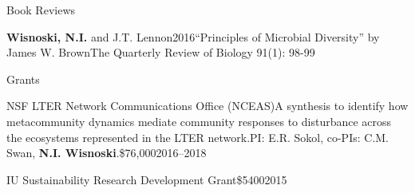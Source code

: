\documentclass{resume} %
\begin{document}
\bigskip

\begin{rhangSection}{Book Reviews}

\begin{Publication}{{\bf Wisnoski, N.I.} and J.T. Lennon}{2016}{\enquote{Principles of Microbial Diversity} by James W. Brown}{The Quarterly Review of Biology 91(1): 98-99}
\end{Publication}

\end{rhangSection}

\bigskip

\begin{rSection}{Grants}

\begin{Grant}{NSF LTER Network Communications Office (NCEAS)}{A synthesis to identify how metacommunity dynamics mediate community responses to disturbance across the ecosystems represented in the LTER network.}{PI: E.R. Sokol, co-PIs: C.M. Swan, {\bf N.I. Wisnoski}.}{\$76,000}{2016--2018}
\end{Grant}


\begin{Grant}{IU Sustainability Research Development Grant}{}{}{\$5400}{2015}
\end{Grant}

\end{rSection}

\bigskip
\end{document}
